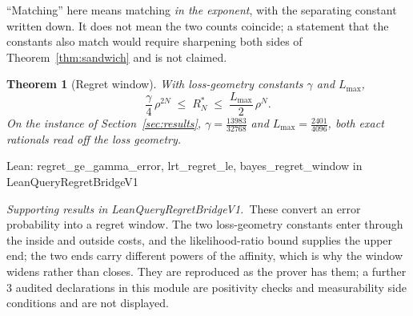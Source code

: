 \documentclass[conference]{IEEEtran}
\newtheorem{theorem}{Theorem}
\theoremstyle{definition}
\newcommand{\lean}[1]{\textsf{\footnotesize #1}}
\newcommand{\leanbox}[1]{%
  \par\vspace{2pt}\noindent
  {\footnotesize\textsf{Lean: #1}}\par\vspace{2pt}}
\begin{document}
``Matching'' here means matching \emph{in the exponent}, with the separating constant written
down. It does not mean the two counts coincide; a statement that the constants also match
would require sharpening both sides of Theorem~\ref{thm:sandwich} and is not claimed.

\begin{theorem}[Regret window]
\label{thm:regret}
With loss-geometry constants $\gamma$ and $L_{\max}$,
\begin{equation}
\frac{\gamma}{4}\,\rho^{2N}\;\leq\;R_{N}^{*}\;\leq\;\frac{L_{\max}}{2}\,\rho^{N}.
\label{eq:regret}
\end{equation}
On the instance of Section~\ref{sec:results}, $\gamma=\tfrac{13983}{32768}$ and
$L_{\max}=\tfrac{2401}{4096}$, both exact rationals read off the loss geometry.
\end{theorem}

\leanbox{\lean{regret\_ge\_gamma\_error}, \lean{lrt\_regret\_le},
\lean{bayes\_regret\_window} in \lean{LeanQueryRegretBridgeV1}}

\noindent\emph{Supporting results in \lean{LeanQueryRegretBridgeV1}.}~These convert an error probability into a regret window. The two loss-geometry constants enter through the inside and outside costs, and the likelihood-ratio bound supplies the upper end; the two ends carry different powers of the affinity, which is why the window widens rather than closes. They are reproduced as the prover has them; a further $3$ audited declarations in this module are positivity checks and measurability side conditions and are not displayed.
\end{document}
